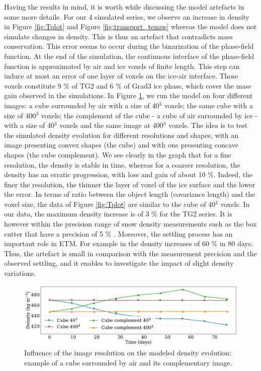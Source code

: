 \documentclass[draft,ms]{agujournal2019}
\begin{document}
Having the results in mind, it is worth while discussing the model artefacts in some more details. 
For our 4 simulated series, we observe an increase in density in Figure \ref{fig:Tplot} and Figure \ref{fig:transport_temps} whereas the model does not simulate changes in density. This is thus an artefact that contradicts mass conservation. This error seems to occur during the binarization of the phase-field function. At the end of the simulation, the continuous interface of the phase-field function is approximated by air and ice voxels of finite length. This step can induce at most an error of one layer of voxels on the ice-air interface. Those voxels constitute 9 \% of TG2 and 6 \% of Grad3 ice phase, which cover the mass gain observed in the simulations. In Figure \ref{fig:cubes}, we run the model on four different images: a cube surrounded by air with a size of 40$^3$ voxels; the same cube with a size of 400$^3$ voxels; the complement of the cube - a cube of air surrounded by ice - with a size of 40$^3$ voxels and the same image at 400$^3$ voxels. The idea is to test the simulated density evolution for different resolutions and shapes, with an image presenting convex shapes (the cube) and with one presenting concave shapes (the cube complement). We see clearly in the graph that for a fine resolution, the density is stable in time, whereas for a coarser resolution, the density has an erratic progression, with loss and gain of about 10 \%. Indeed, the finer the resolution, the thinner the layer of voxel of the ice surface and the lower the error. In terms of ratio between the object length (covariance length) and the voxel size, the data of Figure \ref{fig:Tplot} are similar to the cube of 40$^3$ voxels. %
In our data, the maximum density increase is of 3 \% for the TG2 series. It is however within the precision range of snow density measurements such as the box cutter that have a precision of 5 \% \cite{proksch2016intercomparison}. Moreover, the settling process has an important role in ETM. For example in  the density increases of 60 \% in 80 days. Thus, the artefact is small in comparison with the measurement precision and the observed settling, and it enables to investigate the impact of slight density variations.\\
\begin{figure}
    \centering
    \includegraphics[width=0.9\linewidth]{Figures/cubes_compl_density_propre.pdf}
    \caption{Influence of the image resolution on the modeled density evolution: example of a cube surrounded by air and its complementary image.}
    \label{fig:cubes}
\end{figure}
\end{document}
